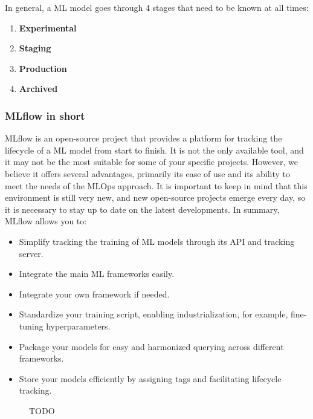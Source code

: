 In general, a ML model goes through 4 stages that need to be known at all times:

\begin{enumerate}
    \item \textbf{Experimental}
    \item \textbf{Staging}
    \item \textbf{Production}
    \item \textbf{Archived}
\end{enumerate}


\subsubsection{MLflow in short}

MLflow is an open-source project that provides a platform for tracking the lifecycle of a ML model from start to finish. It is not the only available tool, and it may not be the most suitable for some of your specific projects. However, we believe it offers several advantages, primarily its ease of use and its ability to meet the needs of the MLOps approach. It is important to keep in mind that this environment is still very new, and new open-source projects emerge every day, so it is necessary to stay up to date on the latest developments. In summary, MLflow allows you to:

\begin{itemize}
    \item Simplify tracking the training of ML models through its API and tracking server.
    \item Integrate the main ML frameworks easily.
    \item Integrate your own framework if needed.
    \item Standardize your training script, enabling industrialization, for example, fine-tuning hyperparameters.
    \item Package your models for easy and harmonized querying across different frameworks.
    \item Store your models efficiently by assigning tags and facilitating lifecycle tracking.
\end{itemize}

\begin{figure}[htbp]
    \centering
    \caption{TODO}
    \label{fig:mlflow-registry}
\end{figure}


